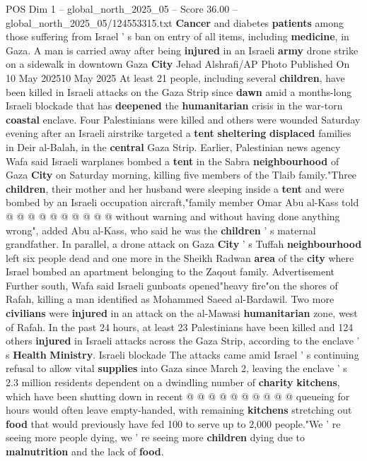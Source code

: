 \begin{textsample}{POS Dim 1 – global\_north\_2025\_05 – Score 36.00 – global\_north\_2025\_05/124553315.txt}  \label{ex:f1_pos_215}
\textbf{Cancer} and diabetes \textbf{patients} among those suffering from Israel ' s ban on entry of all items, including \textbf{medicine}, in Gaza.
A man is carried away after being \textbf{injured} in an Israeli \textbf{army} drone strike on a sidewalk in downtown Gaza \textbf{City} Jehad Alshrafi/AP Photo Published On 10 May 202510 May 2025 At least 21 people, including several \textbf{children}, have been killed in Israeli attacks on the Gaza Strip since \textbf{dawn} amid a months-long Israeli blockade that has \textbf{deepened} the \textbf{humanitarian} crisis in the war-torn \textbf{coastal} enclave.
Four Palestinians were killed and others were wounded Saturday evening after an Israeli airstrike targeted a \textbf{tent} \textbf{sheltering} \textbf{displaced} families in Deir al-Balah, in the \textbf{central} Gaza Strip.
Earlier, Palestinian news agency Wafa said Israeli warplanes bombed a \textbf{tent} in the Sabra \textbf{neighbourhood} of Gaza \textbf{City} on Saturday morning, killing five members of the Tlaib family."Three \textbf{children}, their mother and her husband were sleeping inside a \textbf{tent} and were bombed by an Israeli occupation aircraft,"family member Omar Abu al-Kass told @ @ @ @ @ @ @ @ @ @ without warning and without having done anything wrong", added Abu al-Kass, who said he was the \textbf{children} ' s maternal grandfather.
In parallel, a drone attack on Gaza \textbf{City} ' s Tuffah \textbf{neighbourhood} left six people dead and one more in the Sheikh Radwan \textbf{area} of the \textbf{city} where Israel bombed an apartment belonging to the Zaqout family.
Advertisement Further south, Wafa said Israeli gunboats opened"heavy fire"on the shores of Rafah, killing a man identified as Mohammed Saeed al-Bardawil.
Two more \textbf{civilians} were \textbf{injured} in an attack on the al-Mawasi \textbf{humanitarian} zone, west of Rafah.
In the past 24 hours, at least 23 Palestinians have been killed and 124 others \textbf{injured} in Israeli attacks across the Gaza Strip, according to the enclave ' s \textbf{Health} \textbf{Ministry}.
Israeli blockade The attacks came amid Israel ' s continuing refusal to allow vital \textbf{supplies} into Gaza since March 2, leaving the enclave ' s 2.3 million residents dependent on a dwindling number of \textbf{charity} \textbf{kitchens}, which have been shutting down in recent @ @ @ @ @ @ @ @ @ @ queueing for hours would often leave empty-handed, with remaining \textbf{kitchens} stretching out \textbf{food} that would previously have fed 100 to serve up to 2,000 people."We ' re seeing more people dying, we ' re seeing more \textbf{children} dying due to \textbf{malnutrition} and the lack of \textbf{food}.

\end{textsample}
